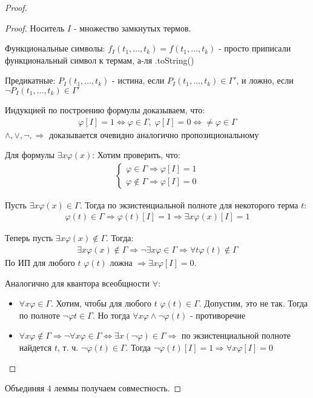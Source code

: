 \begin{proof}
\begin{proof}
    Носитель $I$ - множество замкнутых термов.

    Функциональные символы: $f_I(t_1, \dots, t_k) = f(t_1, \dots, t_k)$ - просто приписали функциональный символ к термам, а-ля .toString()

    Предикатные: $P_I(t_1, \dots, t_k)$ - истина, если $P_I(t_1, \dots, t_k) \in \Gamma'$, и ложно, если $\neg P_I(t_1, \dots, t_k) \in \Gamma'$

    Индукцией по построению формулы доказываем, что:
    \begin{gather*}
        \varphi[I] = 1 \Leftrightarrow \varphi \in \Gamma, \; \varphi[I] = 0 \Leftrightarrow \neq \varphi \in \Gamma
    \end{gather*}
    $\land, \lor, \neg, \Rightarrow$ доказывается очевидно аналогично пропозициональному

    Для формулы $\exists x \varphi(x)$: 
    Хотим проверить, что:
    \begin{gather*}
        \begin{cases}
            \varphi \in \Gamma \Rightarrow \varphi[I] = 1\\
            \varphi \notin \Gamma \Rightarrow \varphi[I] = 0
        \end{cases}
    \end{gather*}

    Пусть $\exists x \varphi(x) \in \Gamma$. Тогда по экзистенциальной полноте для некоторого терма $t$:
    \begin{gather*}
        \varphi(t) \in \Gamma \Rightarrow \varphi(t)[I] = 1 \Rightarrow \exists x \varphi(x)[I] = 1
    \end{gather*}

    Теперь пусть $\exists x \varphi(x) \notin \Gamma$. Тогда:
    \begin{gather*}
        \exists x \varphi(x) \notin \Gamma \Rightarrow \neg \exists x \varphi \in \Gamma \Rightarrow \forall t \varphi(t) \notin \Gamma
    \end{gather*} 
    По ИП для любого $t$ $\varphi(t)$ ложна
    $\Rightarrow \exists x \varphi[I] = 0$. 

    Аналогично для квантора всеобщности $\forall$:
    \begin{itemize}
        \item $\forall x \varphi \in \Gamma$. Хотим, чтобы для любого $t$ $\varphi(t) \in \Gamma$.
        Допустим, это не так. Тогда по полноте $\neg \varphi t \in \Gamma$. Но тогда $\forall x \varphi \land \neg \varphi(t)$ - противоречие 
        \item $\forall x \varphi \notin \Gamma \Rightarrow \neg \forall x \varphi \in \Gamma \Leftrightarrow \exists x(\neg \varphi) \in \Gamma \Rightarrow$ по экзистенциальной полноте
        найдется $t$, т. ч. $\neg \varphi(t) \in \Gamma$. Тогда $\neg \varphi(t)[I] = 1 \Rightarrow \forall x \varphi[I] = 0$ 
    \end{itemize}
\end{proof}

Объединяя 4 леммы получаем совместность.

\end{proof}